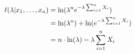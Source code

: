 \begin{align}
    \setcounter{equation}{0}
    \ell(\lambda | x_1, \ldots, x_n) &= \ln(\lambda^n e^{-\lambda \sum_{i = 1}^n X_i}) \\
    &= \ln(\lambda^n) + \ln(e^{-\lambda \sum_{i = 1}^n X_i}) \\
    &= n \cdot \ln(\lambda) -\lambda \sum_{i = 1}^n X_i
\end{align}
